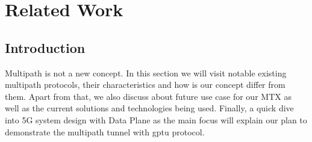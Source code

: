 \cleardoublepage\chapter{Related Work}\label{sec:related_work}\minitoc\vspace{.5cm}

\section{Introduction}



Multipath is not a new concept. In this section we will visit notable existing multipath protocols, their characteristics and how is our concept differ from them.
Apart from that, we also discuss about future use case for our \ac{MTX} as well as the current solutions and 
technologies being used.
Finally, a quick dive into 5G system design with Data Plane as the main focus will explain our plan to demonstrate the multipath tunnel with \ac{gptu} protocol.

